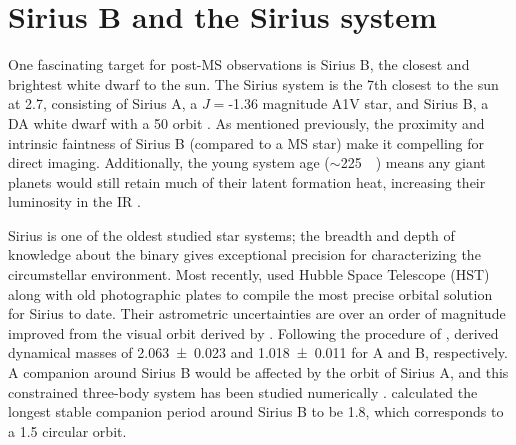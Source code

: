 \documentclass[twocolumn]{aastex631}
\begin{document}

\section{Sirius B and the Sirius system}\label{sec:sirius}

One fascinating target for post-MS observations is Sirius B, the closest and brightest white dwarf to the sun. The Sirius system is the 7th closest to the sun at \qty{2.7}{\parsec}, consisting of Sirius A, a $J=$-1.36 magnitude A1V star, and Sirius B, a DA white dwarf with a \qty{50}{\year} orbit \citep{gaiacollaborationGaiaMission2016,bondSiriusSystemIts2017,gaiacollaborationGaiaEarlyData2021}. As mentioned previously, the proximity and intrinsic faintness of Sirius B (compared to a MS star) make it compelling for direct imaging. Additionally, the young system age ($\sim$\qty{225}{\mega\year}) means any giant planets would still retain much of their latent formation heat, increasing their luminosity in the IR \citep{fortneyGiantPlanetInterior2010}.

Sirius is one of the oldest studied star systems; the breadth and depth of knowledge about the binary gives exceptional precision for characterizing the circumstellar environment. Most recently, \citet{bondSiriusSystemIts2017} used Hubble Space Telescope (HST) along with old photographic plates to compile the most precise orbital solution for Sirius to date. Their astrometric uncertainties are over an order of magnitude improved from the visual orbit derived by \citet{vandenbosOrbitSiriusADS1960}. Following the procedure of \citet{gatewoodStudySirius1978}, \citet{bondSiriusSystemIts2017} derived dynamical masses of \qty{2.063+-0.023}{\solarmass} and \qty{1.018+-0.011}{\solarmass} for A and B, respectively. A companion around Sirius B would be affected by the orbit of Sirius A, and this constrained three-body system has been studied numerically \citep{holmanLongTermStabilityPlanets1999}. \citet{bondSiriusSystemIts2017} calculated the longest stable companion period around Sirius B to be \qty{1.8}{\year}, which corresponds to a \qty{1.5}{\au} circular orbit.
\end{document}

